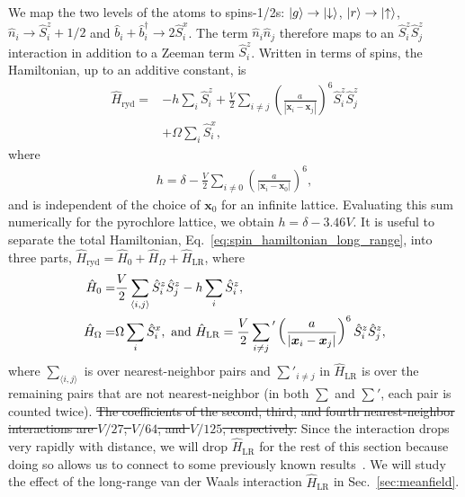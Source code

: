 \documentclass[twocolumn,superscriptaddress,amsmath,amssymb,aps,prx,nofootinbib]{revtex4-2}
\newcommand{\sumlr}[1]{\sum^{}_{#1} {\vphantom{\sum}}'}
\begin{document}
We map the two levels of the atoms to spins-1/2s: $\ket{g} \rightarrow \ket{\downarrow}$, $\ket{r} \rightarrow \ket{\uparrow}$, $\hat{n}_i \rightarrow \hat{S}_i^z +1/2$  and $\hat{b}_i + \hat{b}_i^\dagger \rightarrow 2 \hat{S}_i^x$. The term $\hat{n}_i \hat{n}_j$ therefore maps to an $ \hat{S}_i^z \hat{S}_j^z$ interaction in addition to a Zeeman term $\hat{S}_i^z$. Written in terms of spins, the Hamiltonian, up to an additive constant, is
\begin{equation} \label{eq:spin_hamiltonian_long_range}
\begin{aligned}
\hat{H}_{\text{ryd}} = &- h \sum_i \hat{S}_i^z + \frac{V}{2} \sum_{i \neq j} \left( \frac{a}{|\bm{x}_i - \bm{x}_j| }\right)^6 \hat{S}_i^z \hat{S}_j^z  \\
& + \Omega \sum_i \hat{S}_i^x ,
\end{aligned}
\end{equation}
where
\begin{equation} \label{eq:h_def}
\begin{aligned}
  h = \delta -\frac{V}{2}   \sum^{}_{i \neq 0}  \left( \frac{a}{|\bm{x}_i - \bm{x}_0|} \right)^6, 
  \end{aligned}
\end{equation}
and is independent of the choice of $\bm{x}_0$ for an infinite lattice.
Evaluating this sum numerically for the pyrochlore lattice, we obtain  $h = \delta - 3.46 V$. It is useful to separate the total Hamiltonian, Eq.~\eqref{eq:spin_hamiltonian_long_range}, into three parts, $\hat{H}_{\text{ryd}}=\hat{H}_0 + \hat{H}_{\Omega}+\hat{H}_{\text{LR}}$, where
\begin{equation}\label{eq:hamsplit}
    \begin{aligned}
      \hat{H}_0=& \frac{V}{2}\sum_{\langle i,j \rangle }\hat{S}_i^z \hat{S}_j^z - h \sum_i \hat{S}_i^z,\\
        \hat{H}_{\Omega}=&\Omega \sum_i \hat{S}_i^x, \text{ and }
        \hat{H}_{\text{LR}}= \frac{V}{2} \sumlr{i \neq j} \left( \frac{a}{|\bm{x}_i - \bm{x}_j| }\right)^6 \hat{S}_i^z \hat{S}_j^z,  
    \end{aligned}
\end{equation}
where $\sum_{\langle i,j \rangle }$ is over nearest-neighbor pairs and $\sum'_{i \neq j}$ in $\hat{H}_{\text{LR}}$ is over the remaining pairs that are not nearest-neighbor (in both $\sum$ and $\sum'$, each pair is counted twice). 
\sout{The coefficients of the second, third, and fourth nearest-neighbor interactions are $V/27$, $V/64$, and $V/125$, respectively.} 
Since the interaction drops very rapidly with distance, we will drop $\hat{H}_{\text{LR}}$ for the rest of this section because doing so allows us to connect to some previously known results~\cite{hermele2004,shannon2012,Sikora2009}. We will study the effect of the long-range van der Waals interaction $\hat{H}_{\text{LR}}$ in Sec.~\ref{sec:meanfield}. 
\end{document}
